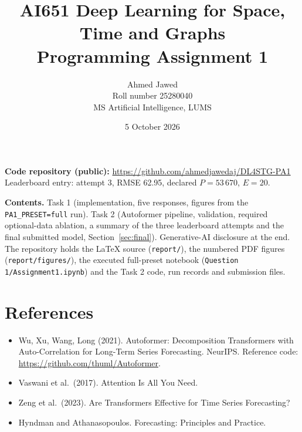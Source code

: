 \documentclass[10pt,a4paper]{article}
\title{AI651 Deep Learning for Space, Time and Graphs\\Programming Assignment 1}
\author{Ahmed Jawed \\ Roll number 25280040 \\ MS Artificial Intelligence, LUMS}
\date{5 October 2026}
\begin{document}
\maketitle
\begin{center}
\textbf{Code repository (public):} \url{https://github.com/ahmedjawedaj/DL4STG-PA1}\\[2pt]
\small Leaderboard entry: attempt 3, RMSE 62.95, declared $P = 53\,670$, $E = 20$.
\end{center}

\noindent\textbf{Contents.} Task 1 (implementation, five responses, figures from the
\texttt{PA1\_PRESET=full} run). Task 2 (Autoformer pipeline, validation, required
optional-data ablation, a summary of the three leaderboard attempts and the final submitted model,
Section~\ref{sec:final}). Generative-AI disclosure at the end. The repository holds the
LaTeX source (\texttt{report/}), the numbered PDF figures (\texttt{report/figures/}), the
executed full-preset notebook (\texttt{Question 1/Assignment1.ipynb}) and the Task 2 code,
run records and submission files.


\clearpage

\clearpage


\section*{References}
\begin{itemize}
\item Wu, Xu, Wang, Long (2021). Autoformer: Decomposition Transformers with Auto-Correlation
for Long-Term Series Forecasting. NeurIPS. Reference code: \url{https://github.com/thuml/Autoformer}.
\item Vaswani et al.\ (2017). Attention Is All You Need.
\item Zeng et al.\ (2023). Are Transformers Effective for Time Series Forecasting?
\item Hyndman and Athanasopoulos. Forecasting: Principles and Practice.
\end{itemize}
\end{document}
